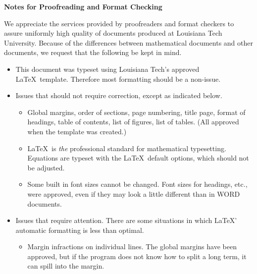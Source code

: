 \documentclass{LA_Tech}
\numberwithin{equation}{chapter}
\begin{document}
\begin{singlespace}

\centerline{\bf Notes for Proofreading and Format Checking}

\vspace{.1in}


We appreciate the services provided by proofreaders and
format checkers to assure uniformly high quality of documents
produced at Louisiana Tech University.
Because of the differences between mathematical
documents and other documents, we request that the following
be kept in mind.

\begin{itemize}
\item
This document was typeset using Louisiana Tech's approved
\LaTeX \ template. Therefore most formatting
should be a non-issue.

\item
Issues that should not require correction, except
as indicated below.

\vspace{.1in} %

\begin{itemize}
\item
Global margins, order of sections, page numbering,
title page, format of
headings, table of contents, list of figures, list of tables.
(All approved when the template was created.)

\item
\LaTeX \ is {\em the} professional standard for mathematical typesetting.
Equations are typeset with
the \LaTeX \ default options, which should not be adjusted.

\item
Some built in font sizes cannot be changed.
Font sizes for headings, etc.,
were approved, even if they may look a little different
than in WORD documents.

\end{itemize}

\item
Issues that require attention.
There are some situations in which
\LaTeX' automatic formatting is less than optimal.

\vspace{.1in} %

\begin{itemize}
\item
Margin infractions on individual lines.
The global margins have been approved, but if the program
does not know how to split a long term, it can spill into the margin.


\end{itemize}
\end{itemize}
\end{singlespace}
\end{document}

